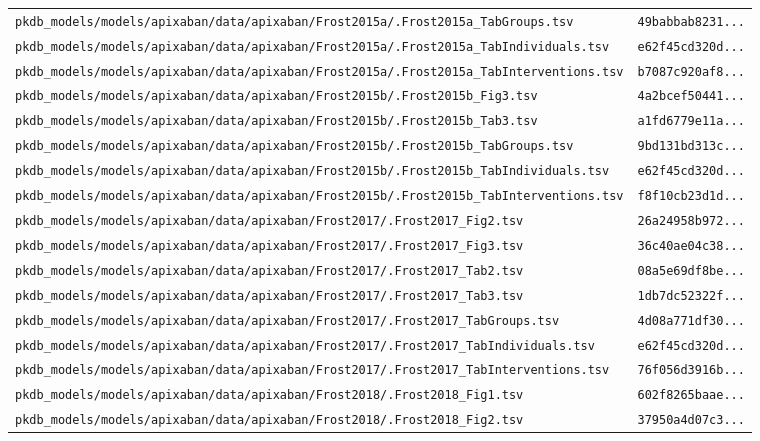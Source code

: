 \begin{longtable}{ll}
\texttt{pkdb\_models/models/apixaban/data/apixaban/Frost2015a/.Frost2015a\_TabGroups.tsv} & \texttt{49babbab8231...} \\
\texttt{pkdb\_models/models/apixaban/data/apixaban/Frost2015a/.Frost2015a\_TabIndividuals.tsv} & \texttt{e62f45cd320d...} \\
\texttt{pkdb\_models/models/apixaban/data/apixaban/Frost2015a/.Frost2015a\_TabInterventions.tsv} & \texttt{b7087c920af8...} \\
\texttt{pkdb\_models/models/apixaban/data/apixaban/Frost2015b/.Frost2015b\_Fig3.tsv} & \texttt{4a2bcef50441...} \\
\texttt{pkdb\_models/models/apixaban/data/apixaban/Frost2015b/.Frost2015b\_Tab3.tsv} & \texttt{a1fd6779e11a...} \\
\texttt{pkdb\_models/models/apixaban/data/apixaban/Frost2015b/.Frost2015b\_TabGroups.tsv} & \texttt{9bd131bd313c...} \\
\texttt{pkdb\_models/models/apixaban/data/apixaban/Frost2015b/.Frost2015b\_TabIndividuals.tsv} & \texttt{e62f45cd320d...} \\
\texttt{pkdb\_models/models/apixaban/data/apixaban/Frost2015b/.Frost2015b\_TabInterventions.tsv} & \texttt{f8f10cb23d1d...} \\
\texttt{pkdb\_models/models/apixaban/data/apixaban/Frost2017/.Frost2017\_Fig2.tsv} & \texttt{26a24958b972...} \\
\texttt{pkdb\_models/models/apixaban/data/apixaban/Frost2017/.Frost2017\_Fig3.tsv} & \texttt{36c40ae04c38...} \\
\texttt{pkdb\_models/models/apixaban/data/apixaban/Frost2017/.Frost2017\_Tab2.tsv} & \texttt{08a5e69df8be...} \\
\texttt{pkdb\_models/models/apixaban/data/apixaban/Frost2017/.Frost2017\_Tab3.tsv} & \texttt{1db7dc52322f...} \\
\texttt{pkdb\_models/models/apixaban/data/apixaban/Frost2017/.Frost2017\_TabGroups.tsv} & \texttt{4d08a771df30...} \\
\texttt{pkdb\_models/models/apixaban/data/apixaban/Frost2017/.Frost2017\_TabIndividuals.tsv} & \texttt{e62f45cd320d...} \\
\texttt{pkdb\_models/models/apixaban/data/apixaban/Frost2017/.Frost2017\_TabInterventions.tsv} & \texttt{76f056d3916b...} \\
\texttt{pkdb\_models/models/apixaban/data/apixaban/Frost2018/.Frost2018\_Fig1.tsv} & \texttt{602f8265baae...} \\
\texttt{pkdb\_models/models/apixaban/data/apixaban/Frost2018/.Frost2018\_Fig2.tsv} & \texttt{37950a4d07c3...} \\

\end{longtable}
